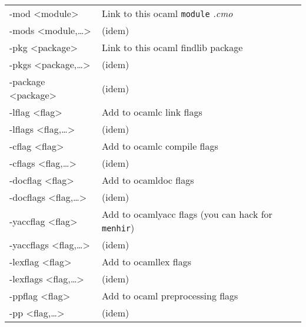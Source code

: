 \documentclass[11pt]{article}
\begin{document}
\begin{table}[htb]
\begin{center}
\begin{tabular}{ll}
 -mod <module>               &  Link to this ocaml \texttt{module} \emph{.cmo}                                \\
 -mods <module,\ldots{}>     &  (idem)                                                                        \\
 -pkg <package>              &  Link to this ocaml findlib package                                            \\
 -pkgs <package,\ldots{}>    &  (idem)                                                                        \\
 -package <package>          &  (idem)                                                                        \\
 -lflag <flag>               &  Add to ocamlc link flags                                                      \\
 -lflags <flag,\ldots{}>     &  (idem)                                                                        \\
 -cflag <flag>               &  Add to ocamlc compile flags                                                   \\
 -cflags <flag,\ldots{}>     &  (idem)                                                                        \\
 -docflag <flag>             &  Add to ocamldoc flags                                                         \\
 -docflags <flag,\ldots{}>   &  (idem)                                                                        \\
 -yaccflag <flag>            &  Add to ocamlyacc flags (you can hack for \texttt{menhir})                     \\
 -yaccflags <flag,\ldots{}>  &  (idem)                                                                        \\
 -lexflag <flag>             &  Add to ocamllex flags                                                         \\
 -lexflags <flag,\ldots{}>   &  (idem)                                                                        \\
\hline
 -ppflag <flag>              &  Add to ocaml preprocessing flags                                              \\
 -pp <flag,\ldots{}>         &  (idem)                                                                        \\

\end{tabular}
\end{center}
\end{table}
\end{document}
